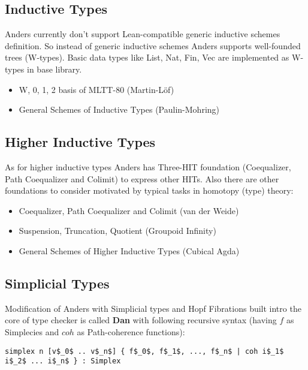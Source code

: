 \documentclass{article}
\begin{document}
\newpage
\subsection{Inductive Types}

Anders currently don’t support Lean-compatible generic inductive schemes
definition. So instead of generic inductive schemes Anders supports well-founded trees (W-types).
Basic data types like List, Nat, Fin, Vec are implemented as W-types in base library.

\begin{itemize}
\item W, 0, 1, 2 basis of MLTT-80 (Martin-L\"{o}f)
\item General Schemes of Inductive Types (Paulin-Mohring)
\end{itemize}

\subsection{Higher Inductive Types}

As for higher inductive types Anders has Three-HIT foundation (Coequalizer, Path Coequalizer and Colimit)
to express other HITs. Also there are other foundations to consider motivated by typical tasks in homotopy (type) theory:

\begin{itemize}
\item Coequalizer, Path Coequalizer and Colimit (van der Weide)
\item Suspension, Truncation, Quotient (Groupoid Infinity)
\item General Schemes of Higher Inductive Types (Cubical Agda)
\end{itemize}

\subsection{Simplicial Types}

Modification of Anders with Simplicial types and Hopf Fibrations built intro the core of type checker
is called \textbf{Dan} with following recursive syntax (having $f$ as Simplecies and $coh$ as Path-coherence functions):

\begin{lstlisting}[mathescape=true]
simplex n [v$_0$ .. v$_n$] { f$_0$, f$_1$, ..., f$_n$ | coh i$_1$ i$_2$ ... i$_n$ } : Simplex
\end{lstlisting}
\end{document}
